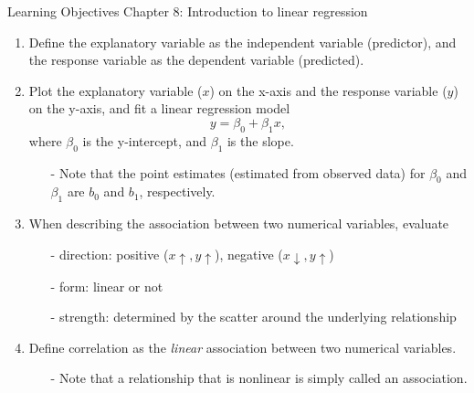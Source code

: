 \documentclass[11pt]{article}
\begin{document}
{\LARGE \textcolor{oiB}{Learning Objectives \hfill Chapter 8: Introduction to linear regression}} \\


%
\begin{enumerate}
\renewcommand\labelenumi{\textcolor{light}{\textbf{LO \theenumi.}}}

\item Define the explanatory variable as the independent variable (predictor), and the response variable as the dependent variable (predicted).

\item Plot the explanatory variable ($x$) on the x-axis and the response variable ($y$) on the y-axis, and fit a linear regression model
\[ y = \beta_0 + \beta_1 x,\]
where $\beta_0$ is the y-intercept, and $\beta_1$ is the slope.
\begin{itemize}
\item[-] Note that the point estimates (estimated from observed data) for $\beta_0$ and $\beta_1$ are $b_0$ and $b_1$, respectively.
\end{itemize}

\item When describing the association between two numerical variables, evaluate
\begin{itemize}
\item[-] direction: positive ($x \uparrow, y \uparrow$), negative ($x \downarrow, y \uparrow$)
\item[-] form: linear or not
\item[-] strength: determined by the scatter around the underlying relationship
\end{itemize}

\item Define correlation as the \emph{linear} association between two numerical variables.
\begin{itemize}
\item[-] Note that a relationship that is nonlinear is simply called an association.
\end{itemize}


\end{enumerate}
\end{document}
